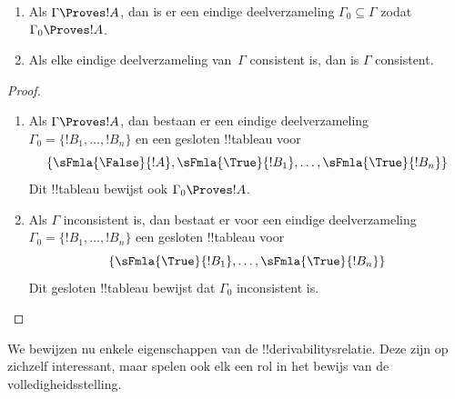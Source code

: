 \documentclass[openany]{memoir}
\begin{document}
\begin{prop}[Compactheid]
  \begin{enumerate}
  \item Als $\Gamma \Proves !A$, dan is er een eindige deelverzameling
    $\Gamma_0 \subseteq \Gamma$ zodat $\Gamma_0 \Proves !A$.
  \item Als elke eindige deelverzameling van~$\Gamma$ consistent is,
    dan is $\Gamma$ consistent.
  \end{enumerate}
\end{prop}

\begin{proof}
  \begin{enumerate}
    \item Als $\Gamma \Proves !A$, dan bestaan er een eindige
      deelverzameling $\Gamma_0 = \{!B_1, \dots, !B_n\}$ en een
      gesloten !!{tableau} voor
      \[
      \{\sFmla{\False}{!A}, \sFmla{\True}{!B_1}, \dots, \sFmla{\True}{!B_n}\}
      \]
      Dit !!{tableau} bewijst ook $\Gamma_0 \Proves !A$.
    \item Als $\Gamma$ inconsistent is, dan bestaat er voor een eindige
      deelverzameling $\Gamma_0 = \{!B_1, \dots, !B_n\}$ een gesloten
      !!{tableau} voor
      \[
      \{\sFmla{\True}{!B_1}, \dots, \sFmla{\True}{!B_n}\}
      \]
      Dit gesloten !!{tableau} bewijst dat $\Gamma_0$ inconsistent is.
  \end{enumerate}
\end{proof}
\endgroup

\begingroup
\def\olfilename{OLP-0106}
\def\olfilepath{content/first-order-logic/tableaux/}
\hypertarget{unit-OLP-0106}{}



      {}
      {}


We bewijzen nu enkele eigenschappen van de !!{derivability}srelatie.
Deze zijn op zichzelf interessant, maar spelen ook elk een rol in het
bewijs van de volledigheidsstelling.
\end{document}
